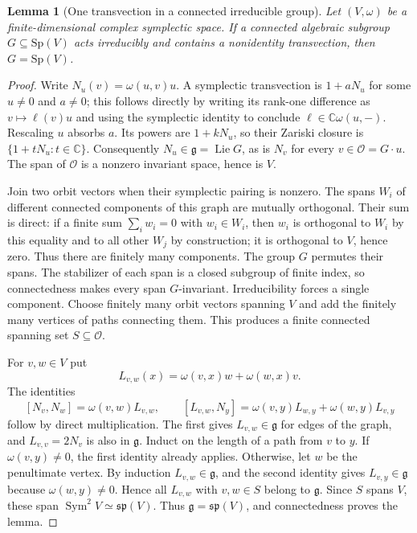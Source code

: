 \documentclass[11pt,a4paper]{article}
\newtheorem{lemma}[theorem]{Lemma}
\theoremstyle{definition}
\theoremstyle{remark}
\numberwithin{equation}{section}
\begin{document}
\begin{lemma}[One transvection in a connected irreducible group]
\label{p7:fe:transvection}
Let $(V,\omega)$ be a finite-dimensional complex symplectic space.
If a connected algebraic subgroup $G\subseteq\mathrm{Sp}(V)$ acts
irreducibly and contains a nonidentity transvection, then
$G=\mathrm{Sp}(V)$.
\end{lemma}
\begin{proof}
Write $N_u(v)=\omega(u,v)u$. A symplectic transvection is
$1+aN_u$ for some $u\ne0$ and $a\ne0$; this follows directly by
writing its rank-one difference as $v\mapsto\ell(v)u$ and using
the symplectic identity to conclude $\ell\in\mathbb C\omega(u,-)$.
Rescaling $u$ absorbs $a$. Its powers are $1+kN_u$, so their
Zariski closure is $\{1+tN_u:t\in\mathbb C\}$.
Consequently $N_u\in\mathfrak g=\operatorname{Lie}G$, as is
$N_v$ for every $v\in\mathcal O=G\cdot u$.
The span of $\mathcal O$ is a nonzero invariant space, hence is $V$.

Join two orbit vectors when their symplectic pairing is nonzero.
The spans $W_i$ of different connected components of this graph
are mutually orthogonal. Their sum is direct: if a finite sum
$\sum_iw_i=0$ with $w_i\in W_i$, then $w_i$ is orthogonal to
$W_i$ by this equality and to all other $W_j$ by construction;
it is orthogonal to $V$, hence zero. Thus there are finitely many
components. The group $G$ permutes their spans. The stabilizer of
each span is a closed subgroup of finite index, so connectedness
makes every span $G$-invariant. Irreducibility forces a single
component. Choose finitely many orbit vectors spanning $V$ and
add the finitely many vertices of paths connecting them. This
produces a finite connected spanning set $S\subseteq\mathcal O$.

For $v,w\in V$ put
\[
 L_{v,w}(x)=\omega(v,x)w+\omega(w,x)v.
\]
The identities
\[
 [N_v,N_w]=\omega(v,w)L_{v,w},\qquad
 [L_{v,w},N_y]=\omega(v,y)L_{w,y}+\omega(w,y)L_{v,y}
 \tag{T}
\]
follow by direct multiplication. The first gives $L_{v,w}\in
\mathfrak g$ for edges of the graph, and $L_{v,v}=2N_v$ is also
in $\mathfrak g$. Induct on the length of a path from $v$ to $y$.
If $\omega(v,y)\ne0$, the first identity already applies. Otherwise,
let $w$ be the penultimate vertex. By induction $L_{v,w}\in
\mathfrak g$, and the second identity gives $L_{v,y}\in\mathfrak g$
because $\omega(w,y)\ne0$. Hence all $L_{v,w}$ with $v,w\in S$
belong to $\mathfrak g$. Since $S$ spans $V$, these span
$\operatorname{Sym}^2V\simeq\mathfrak{sp}(V)$. Thus
$\mathfrak g=\mathfrak{sp}(V)$, and connectedness proves the lemma.
\end{proof}
\end{document}
